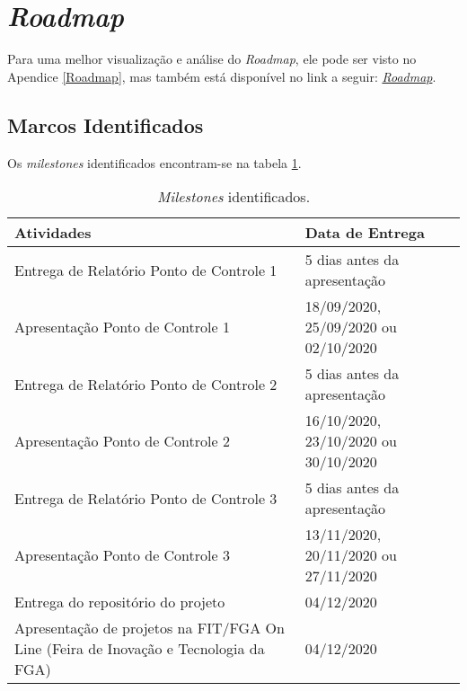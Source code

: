 \section{ \textit{Roadmap}}
Para uma melhor visualização e análise do  \textit{Roadmap}, ele pode ser visto no Apendice \ref{Roadmap}, mas também está disponível no link a seguir: \href{https://docs.google.com/spreadsheets/d/13mSpMqhIIh5OHl95djhCfA4ejr36CvJLpA65PvluUAU/edit?usp=sharing}{ \textit{Roadmap}}.

\subsection{Marcos Identificados}
\label{Milestones Identificados}
Os \textit{milestones} identificados encontram-se na tabela \ref{tab:tabelamilestones}. 




\begin{table}[H]
\begin{tabular}{|p{8cm}|p{6cm}|}
\hline
\textbf{Atividades}  & \textbf{Data de Entrega}         
\\ \hline

Entrega de Relatório Ponto de Controle 1    & 5 dias antes da apresentação
\\ \hline

Apresentação Ponto de Controle 1 &  18/09/2020, 25/09/2020 ou 02/10/2020

\\ \hline

Entrega de Relatório Ponto de Controle 2  & 5 dias antes da apresentação 
\\ \hline

Apresentação Ponto de Controle 2 & 16/10/2020, 23/10/2020 ou 30/10/2020
\\ \hline

Entrega de Relatório Ponto de Controle 3 & 5 dias antes da apresentação
\\ \hline
Apresentação Ponto de Controle 3 & 13/11/2020, 20/11/2020 ou 27/11/2020
\\ \hline
Entrega do repositório do projeto & 04/12/2020
\\ \hline
Apresentação de projetos na FIT/FGA On Line
(Feira de Inovação e Tecnologia da FGA) & 04/12/2020

\\ \hline
\end{tabular}
\caption{ \textit{Milestones} identificados.}
\label{tab:tabelamilestones}
\end{table}